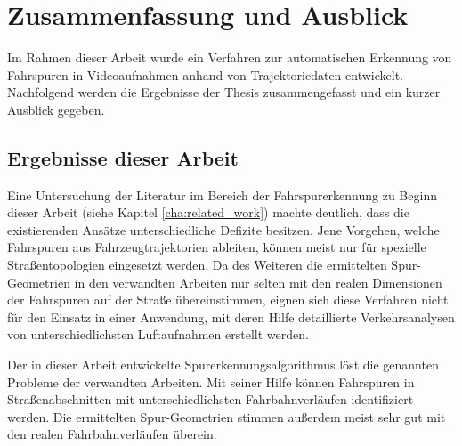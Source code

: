 
\chapter{Zusammenfassung und Ausblick}
\label{cha:end}

Im Rahmen dieser Arbeit wurde ein Verfahren zur automatischen Erkennung von Fahrspuren in Videoaufnahmen
anhand von Trajektoriedaten entwickelt.
Nachfolgend werden die Ergebnisse der Thesis zusammengefasst und ein kurzer Ausblick gegeben.

\section{Ergebnisse dieser Arbeit}



Eine Untersuchung der Literatur im Bereich der Fahrspurerkennung zu Beginn dieser Arbeit
(siehe Kapitel \ref{cha:related_work}) machte deutlich, dass die existierenden Ansätze unterschiedliche
Defizite besitzen. Jene Vorgehen, welche Fahrspuren aus Fahrzeugtrajektorien ableiten, können meist nur für
spezielle Straßentopologien eingesetzt werden.
Da des Weiteren die ermittelten Spur-Geometrien in den verwandten Arbeiten nur selten mit den realen Dimensionen
der Fahrspuren auf der Straße übereinstimmen, eignen sich diese Verfahren nicht für den Einsatz in einer
Anwendung, mit deren Hilfe detaillierte Verkehrsanalysen von unterschiedlichsten Luftaufnahmen erstellt werden.

Der in dieser Arbeit entwickelte Spurerkennungsalgorithmus löst die genannten Probleme der verwandten Arbeiten.
Mit seiner Hilfe können Fahrspuren in Straßenabschnitten mit unterschiedlichsten Fahrbahnverläufen identifiziert werden.
Die ermittelten Spur-Geometrien stimmen außerdem meist sehr gut mit den realen Fahrbahnverläufen überein.


